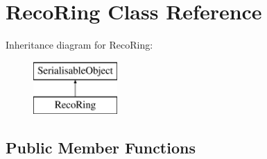\hypertarget{classRecoRing}{\section{Reco\-Ring Class Reference}
\label{classRecoRing}
}
Inheritance diagram for Reco\-Ring\-:\begin{figure}[H]
\begin{center}
\leavevmode
\includegraphics[height=2.000000cm]{classRecoRing}
\end{center}
\end{figure}
\subsection*{Public Member Functions}
